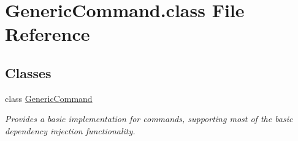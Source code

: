 \hypertarget{GenericCommand_8class}{\section{Generic\-Command.\-class File Reference}
\label{GenericCommand_8class}
}
\subsection*{Classes}
\begin{DoxyCompactItemize}
\item 
class \hyperlink{classGenericCommand}{Generic\-Command}
\begin{DoxyCompactList}\small\item\em Provides a basic implementation for commands, supporting most of the basic dependency injection functionality. \end{DoxyCompactList}\end{DoxyCompactItemize}
